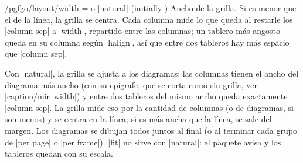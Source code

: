 \begin{key}{/pgfgo/layout/width =  o |natural| (initially \texttt{\string\linewidth})}
	Ancho de la grilla. Si es menor que el de la línea, la grilla se centra. Cada columna mide lo que queda al restarle los |column sep| a |width|, repartido entre las columnas; un tablero más angosto queda en su columna según |halign|, así que entre dos tableros hay más espacio que |column sep|.

	Con |natural|, la grilla se ajusta a los diagramas: las columnas tienen el ancho del diagrama más ancho (con su epígrafe, que se corta como sin grilla, ver |caption/min width|) y entre dos tableros del mismo ancho queda exactamente |column sep|. La grilla mide eso por la cantidad de columnas (o de diagramas, si son menos) y se centra en la línea; si es más ancha que la línea, se sale del margen. Los diagramas se dibujan todos juntos al final (o al terminar cada grupo de |per page| o |per frame|). |fit| no sirve con |natural|: el paquete avisa y los tableros quedan con su escala.

	\begin{codeexample}
		\begin{pgfgolayout}[columns = 2, width = natural, column sep = 0em, row sep = 0em]
			\begin{goban}[partial = A9:E5, scale = 0.5]\end{goban}
			\begin{goban}[partial = E9:I5, scale = 0.5]\end{goban}
			\begin{goban}[partial = A1:E5, scale = 0.5]\end{goban}
			\begin{goban}[partial = E1:I5, scale = 0.5]\end{goban}
		\end{pgfgolayout}
	\end{codeexample}

	\begin{pgfgolayout}[columns = 2, width = natural, column sep = 0em, row sep = 0em]
		\begin{goban}[partial = A9:E5, scale = 0.5]\end{goban}
		\begin{goban}[partial = E9:I5, scale = 0.5]\end{goban}
		\begin{goban}[partial = A1:E5, scale = 0.5]\end{goban}
		\begin{goban}[partial = E1:I5, scale = 0.5]\end{goban}
	\end{pgfgolayout}
\end{key}

